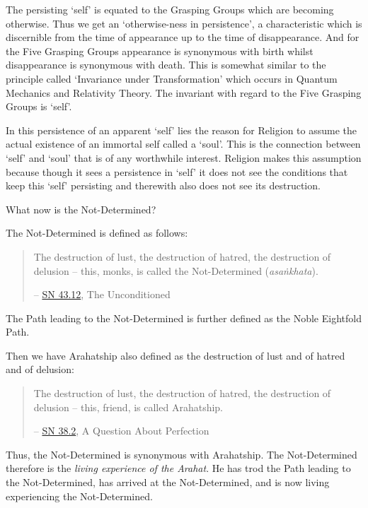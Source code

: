 The persisting `self' is equated to the Grasping Groups which are becoming otherwise. Thus we get an `otherwise-ness in persistence', a characteristic which is discernible from the time of appearance up to the time of disappearance. And for the Five Grasping Groups appearance is synonymous with birth whilst disappearance is synonymous with death. This is somewhat similar to the principle called `Invariance under Transformation' which occurs in Quantum Mechanics and Relativity Theory. The invariant with regard to the Five Grasping Groups is `self'.

In this persistence of an apparent `self' lies the reason for Religion to assume the actual existence of an immortal self called a `soul'. This is the connection between `self' and `soul' that is of any worthwhile interest. Religion makes this assumption because though it sees a persistence in `self' it does not see the conditions that keep this `self' persisting and therewith also does not see its destruction.

What now is the Not-Determined?

The Not-Determined is defined as follows:

\begin{quote}
The destruction of lust, the destruction of hatred, the destruction of delusion -- this, monks, is called the Not-Determined (\textit{asaṅkhata}).

 -- \href{https://suttacentral.net/sn43.12/en/bodhi}{SN 43.12}, The Unconditioned
\end{quote}

The Path leading to the Not-Determined is further defined as the Noble Eightfold Path.

Then we have Arahatship also defined as the destruction of lust and of hatred and of delusion:

\begin{quote}
The destruction of lust, the destruction of hatred, the destruction of delusion -- this, friend, is called Arahatship.

 -- \href{https://suttacentral.net/sn38.2/en/sujato}{SN 38.2}, A Question About Perfection
\end{quote}

\protect\hypertarget{living-experience}{}{}Thus, the Not-Determined is synonymous with Arahatship. The Not-Determined therefore is the \emph{living experience of the Arahat}. He has trod the Path leading to the Not-Determined, has arrived at the Not-Determined, and is now living experiencing the Not-Determined.

